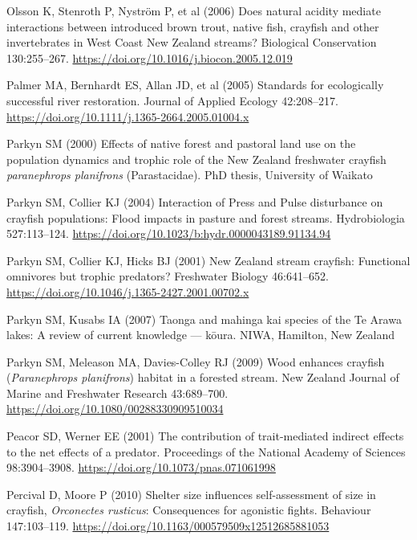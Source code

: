 \documentclass[
  12pt,
  a4paper,
]{scrbook}
\newlength{\cslhangindent}
\newenvironment{CSLReferences}[2] %
 {\begin{list}{}{%
  \setlength{\itemindent}{0pt}
  \setlength{\leftmargin}{0pt}
  \setlength{\parsep}{0pt}
  \ifodd #1
   \setlength{\leftmargin}{\cslhangindent}
   \setlength{\itemindent}{-1\cslhangindent}
  \fi
  \setlength{\itemsep}{#2\baselineskip}}}
 {\end{list}}
\begin{document}
\begin{CSLReferences}{1}{1}
Olsson K, Stenroth P, Nyström P, et al (2006) Does natural acidity
mediate interactions between introduced brown trout, native fish,
crayfish and other invertebrates in {West Coast New Zealand} streams?
Biological Conservation 130:255--267.
\url{https://doi.org/10.1016/j.biocon.2005.12.019}

Palmer MA, Bernhardt ES, Allan JD, et al (2005) Standards for
ecologically successful river restoration. Journal of Applied Ecology
42:208--217. \url{https://doi.org/10.1111/j.1365-2664.2005.01004.x}

Parkyn SM (2000) Effects of native forest and pastoral land use on the
population dynamics and trophic role of the {New Zealand} freshwater
crayfish \emph{paranephrops planifrons} ({Parastacidae}). PhD thesis,
University of Waikato

Parkyn SM, Collier KJ (2004) Interaction of {Press} and {Pulse}
disturbance on crayfish populations: Flood impacts in pasture and forest
streams. Hydrobiologia 527:113--124.
\url{https://doi.org/10.1023/b:hydr.0000043189.91134.94}

Parkyn SM, Collier KJ, Hicks BJ (2001) {New Zealand} stream crayfish:
Functional omnivores but trophic predators? Freshwater Biology
46:641--652. \url{https://doi.org/10.1046/j.1365-2427.2001.00702.x}

Parkyn SM, Kusabs IA (2007) Taonga and mahinga kai species of the {Te
Arawa} lakes: A review of current knowledge --- kōura. NIWA, Hamilton,
New Zealand

Parkyn SM, Meleason MA, Davies-Colley RJ (2009) Wood enhances crayfish
({\emph{Paranephrops planifrons}}) habitat in a forested stream. New
Zealand Journal of Marine and Freshwater Research 43:689--700.
\url{https://doi.org/10.1080/00288330909510034}

Peacor SD, Werner EE (2001) The contribution of trait-mediated indirect
effects to the net effects of a predator. Proceedings of the National
Academy of Sciences 98:3904--3908.
\url{https://doi.org/10.1073/pnas.071061998}

Percival D, Moore P (2010) Shelter size influences self-assessment of
size in crayfish, {\emph{Orconectes rusticus}}: Consequences for
agonistic fights. Behaviour 147:103--119.
\url{https://doi.org/10.1163/000579509x12512685881053}


\end{CSLReferences}
\end{document}
